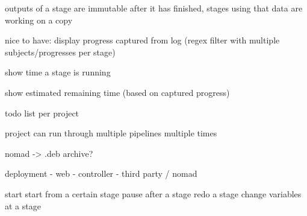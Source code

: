  
 outputs of a stage are immutable after it has finished, stages using that data are working on a copy
 
 nice to have: display progress captured from log (regex filter with multiple subjects/progresses per stage)
 
 show time a stage is running
 
 show estimated remaining time (based on captured progress)
     
  todo list per project
  
  project can run through multiple pipelines multiple times
  
  nomad -> .deb archive?
  
deployment
 - web
 - controller
 - third party / nomad
     
start
start from a certain stage
pause after a stage
redo a stage
change variables at a stage